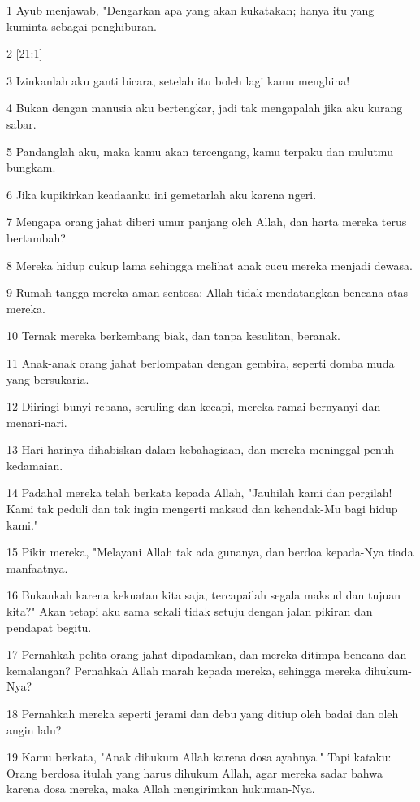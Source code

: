 \par 1 Ayub menjawab, "Dengarkan apa yang akan kukatakan; hanya itu yang kuminta sebagai penghiburan.
\par 2 [21:1]
\par 3 Izinkanlah aku ganti bicara, setelah itu boleh lagi kamu menghina!
\par 4 Bukan dengan manusia aku bertengkar, jadi tak mengapalah jika aku kurang sabar.
\par 5 Pandanglah aku, maka kamu akan tercengang, kamu terpaku dan mulutmu bungkam.
\par 6 Jika kupikirkan keadaanku ini gemetarlah aku karena ngeri.
\par 7 Mengapa orang jahat diberi umur panjang oleh Allah, dan harta mereka terus bertambah?
\par 8 Mereka hidup cukup lama sehingga melihat anak cucu mereka menjadi dewasa.
\par 9 Rumah tangga mereka aman sentosa; Allah tidak mendatangkan bencana atas mereka.
\par 10 Ternak mereka berkembang biak, dan tanpa kesulitan, beranak.
\par 11 Anak-anak orang jahat berlompatan dengan gembira, seperti domba muda yang bersukaria.
\par 12 Diiringi bunyi rebana, seruling dan kecapi, mereka ramai bernyanyi dan menari-nari.
\par 13 Hari-harinya dihabiskan dalam kebahagiaan, dan mereka meninggal penuh kedamaian.
\par 14 Padahal mereka telah berkata kepada Allah, "Jauhilah kami dan pergilah! Kami tak peduli dan tak ingin mengerti maksud dan kehendak-Mu bagi hidup kami."
\par 15 Pikir mereka, "Melayani Allah tak ada gunanya, dan berdoa kepada-Nya tiada manfaatnya.
\par 16 Bukankah karena kekuatan kita saja, tercapailah segala maksud dan tujuan kita?" Akan tetapi aku sama sekali tidak setuju dengan jalan pikiran dan pendapat begitu.
\par 17 Pernahkah pelita orang jahat dipadamkan, dan mereka ditimpa bencana dan kemalangan? Pernahkah Allah marah kepada mereka, sehingga mereka dihukum-Nya?
\par 18 Pernahkah mereka seperti jerami dan debu yang ditiup oleh badai dan oleh angin lalu?
\par 19 Kamu berkata, "Anak dihukum Allah karena dosa ayahnya." Tapi kataku: Orang berdosa itulah yang harus dihukum Allah, agar mereka sadar bahwa karena dosa mereka, maka Allah mengirimkan hukuman-Nya.
